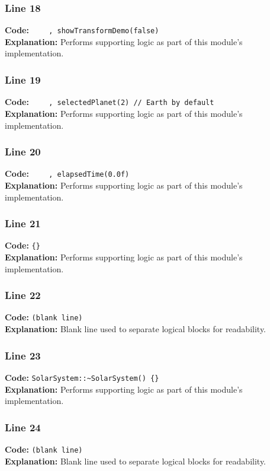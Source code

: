 \documentclass[11pt,a4paper]{article}
\begin{document}
\subsubsection*{Line 18}
\textbf{Code:} \verb|    , showTransformDemo(false)|\\
\textbf{Explanation:} Performs supporting logic as part of this module's implementation.

\subsubsection*{Line 19}
\textbf{Code:} \verb|    , selectedPlanet(2) // Earth by default|\\
\textbf{Explanation:} Performs supporting logic as part of this module's implementation.

\subsubsection*{Line 20}
\textbf{Code:} \verb|    , elapsedTime(0.0f)|\\
\textbf{Explanation:} Performs supporting logic as part of this module's implementation.

\subsubsection*{Line 21}
\textbf{Code:} \verb|{}|\\
\textbf{Explanation:} Performs supporting logic as part of this module's implementation.

\subsubsection*{Line 22}
\textbf{Code:} \texttt{(blank line)}\\
\textbf{Explanation:} Blank line used to separate logical blocks for readability.

\subsubsection*{Line 23}
\textbf{Code:} \verb|SolarSystem::~SolarSystem() {}|\\
\textbf{Explanation:} Performs supporting logic as part of this module's implementation.

\subsubsection*{Line 24}
\textbf{Code:} \texttt{(blank line)}\\
\textbf{Explanation:} Blank line used to separate logical blocks for readability.
\end{document}
